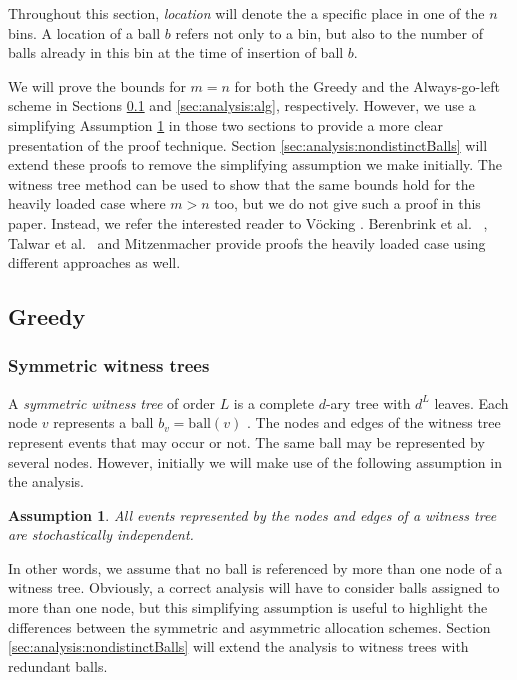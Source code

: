 \documentclass[a4paper,12pt]{article}
\newtheorem{assumption}{Assumption}
\begin{document}
Throughout this section, \emph{location} will denote the a specific place in one of the $n$ bins. A location of a ball $b$ refers not only to a bin, but also to the number of balls already in this bin at the time of insertion of ball $b$.

We will prove the bounds for $m=n$ for both the Greedy and the Always-go-left scheme in Sections \ref{sec:analysis:greedy} and \ref{sec:analysis:alg}, respectively. However, we use a simplifying Assumption \ref{assumption:independence} in those two sections to provide a more clear presentation of the proof technique. Section \ref{sec:analysis:nondistinctBalls} will extend these proofs to remove the simplifying assumption we make initially. The witness tree method can be used to show that the same bounds hold for the heavily loaded case where $m> n$ too, but we do not give such a proof in this paper. Instead, we refer the interested reader to V\"ocking \cite{VOC03}. Berenbrink et al.  ~\cite{BCSV06}, Talwar et al.~\cite{TW13} and Mitzenmacher \cite{MRS01} provide proofs the heavily loaded case using different approaches as well.

\subsection{Greedy}
\label{sec:analysis:greedy}

\subsubsection{Symmetric witness trees}
\label{sec:analysis:definitionSymWT}
A \emph{symmetric witness tree} of order $L$ is a complete $d$-ary tree with $d^{L}$ leaves. Each node $v$ represents a ball $b_v = \mathrm{ball}(v)$ . The nodes and edges of the witness tree represent events that may occur or not. The same ball may be represented by several nodes. However, initially we will make use of the following assumption in the analysis.
\begin{assumption}
\label{assumption:independence}
All events represented by the nodes and edges of a witness tree are stochastically independent. 
\end{assumption}
In other words, we assume that no ball is referenced by more than one node of a witness tree. Obviously, a correct analysis will have to consider balls assigned to more than one node, but this simplifying assumption is useful to highlight the differences between the symmetric and asymmetric allocation schemes. Section \ref{sec:analysis:nondistinctBalls} will extend the analysis to witness trees with redundant balls.
\end{document}
